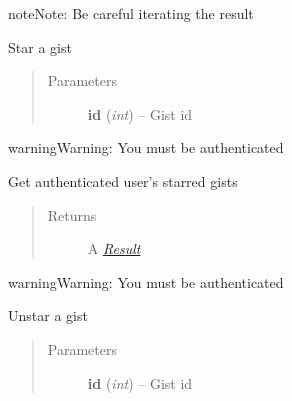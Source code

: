 \documentclass[letterpaper,10pt,english]{sphinxmanual}
\begin{document}
\begin{fulllineitems}
\begin{fulllineitems}
\begin{notice}{note}{Note:}
Be careful iterating the result
\end{notice}

\end{fulllineitems}


\begin{fulllineitems}
\label{gists:pygithub3.services.gists.Gist.star}
Star a gist
\begin{quote}\begin{description}
\item[{Parameters}] \leavevmode
\textbf{id} (\emph{int}) -- Gist id

\end{description}\end{quote}

\begin{notice}{warning}{Warning:}
You must be authenticated
\end{notice}

\end{fulllineitems}


\begin{fulllineitems}
\label{gists:pygithub3.services.gists.Gist.starred}
Get authenticated user's starred gists
\begin{quote}\begin{description}
\item[{Returns}] \leavevmode
A {\hyperref[result::doc]{\emph{Result}}}

\end{description}\end{quote}

\begin{notice}{warning}{Warning:}
You must be authenticated
\end{notice}

\end{fulllineitems}


\begin{fulllineitems}
\label{gists:pygithub3.services.gists.Gist.unstar}
Unstar a gist
\begin{quote}\begin{description}
\item[{Parameters}] \leavevmode
\textbf{id} (\emph{int}) -- Gist id


\end{description}
\end{quote}
\end{fulllineitems}
\end{fulllineitems}
\end{document}

